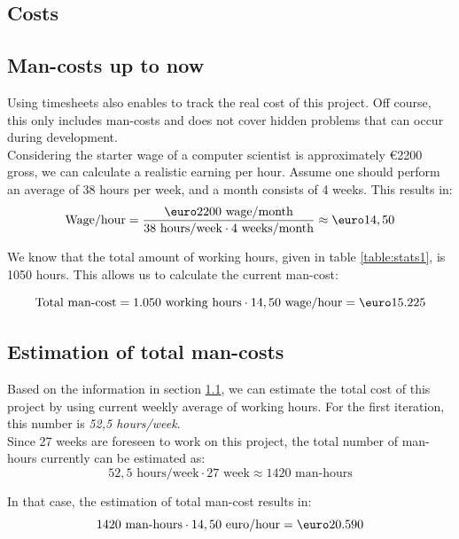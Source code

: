 \documentclass[salesmen, twoside]{../../../templates/latex/2009/softproj}
\begin{document}
\begin{projdoc}
			
			\section{Costs}
			
			\subsection{Man-costs up to now}
			\label{sec:costsofar}
			
			Using timesheets also enables to track the real cost of this project. Off course,
			this only includes man-costs and does not cover hidden problems that can occur during
			development. \\
			
			Considering the starter wage of a computer scientist is approximately \euro 2200 gross, we can calculate a 
			realistic earning per hour. Assume one should perform an average of 38 hours per week, 
			and a month consists of 4 weeks. This results in:
			\[ \textrm{Wage/hour} = \frac{\textrm{\euro} 2200 \textrm{ wage/month}}{38 \textrm{ hours/week} \cdot 4 \textrm{ weeks/month}} \approx \textrm{\euro} 14,50 \]
			 
			We know that the total amount of working hours, given in table \ref{table:stats1}, is 1050 hours. This 
			allows us to calculate the current man-cost:
			
			\[ \textrm{Total man-cost} = 1.050 \textrm{ working hours} \cdot 14,50 \textrm{ wage/hour} = \textrm{\euro} 15.225 \]
			
			
			
			\subsection{Estimation of total man-costs}
			
			Based on the information in section \ref{sec:costsofar}, we can estimate the total cost of this project
			by using current weekly average of working hours. 
			For the first iteration, this number is \emph{52,5 hours/week}. \\
			
			Since 27 weeks are foreseen to work on this project, the total number of man-hours currently can 
			be estimated as:
			\[ 52,5 \textrm{ hours/week} \cdot  27 \textrm{ week} \approx 1420 \textrm{ man-hours} \]
			
			In that case, the estimation of total man-cost results in:
			\[ 1420 \textrm{ man-hours} \cdot  14,50 \textrm{ euro/hour} = \textrm{\euro} 20.590 \]


\end{projdoc}
\end{document}
